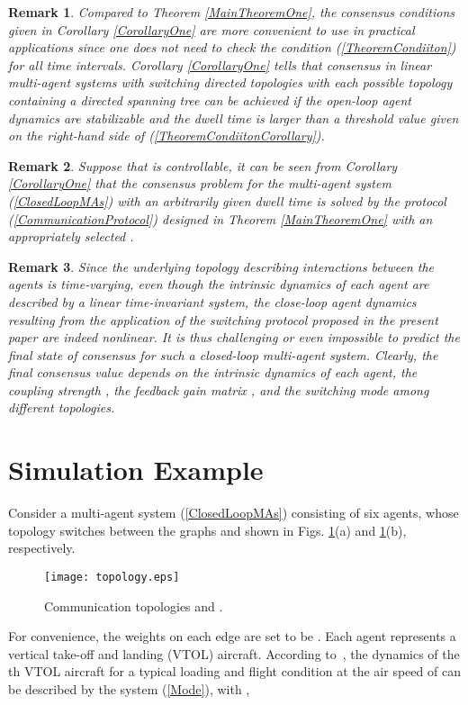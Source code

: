 \documentclass[letterpaper, 10 pt, conference]{ieeeconf}
\newtheorem{remark}{Remark}
\begin{document}
\begin{remark}
Compared to Theorem \ref{MainTheoremOne}, the consensus conditions given in
Corollary \ref{CorollaryOne} are
more convenient to use in practical applications since one does not need to
check the condition (\ref{TheoremCondiiton}) for all time intervals.
Corollary \ref{CorollaryOne} tells that consensus in linear multi-agent
systems with switching directed topologies with each possible topology
containing a directed spanning tree can be achieved if the open-loop agent
dynamics are stabilizable and the dwell time is larger than a threshold
value given on the right-hand side of (\ref{TheoremCondiitonCorollary}).
\end{remark}

\begin{remark}\label{ControllableAnyDwelltime}
Suppose that  is controllable,  it can be seen from Corollary
\ref{CorollaryOne} that the
consensus problem
  for the multi-agent system
(\ref{ClosedLoopMAs}) with an arbitrarily given dwell time 
is solved by
  the protocol
  (\ref{CommunicationProtocol}) designed in Theorem
\ref{MainTheoremOne} with an appropriately selected .
 \end{remark}


\begin{remark}\label{RemarkOnFinalConsensusValue}
Since the underlying topology describing
  interactions between the agents is time-varying,
even though the intrinsic dynamics of each
agent are described by a linear time-invariant system, the close-loop agent
dynamics resulting from the application of
  the switching protocol proposed
in the present paper are indeed nonlinear. It is thus challenging or even
impossible to predict the final
state of consensus for such
a closed-loop multi-agent system. Clearly, the final consensus value depends on the intrinsic dynamics of each agent, the coupling strength , the feedback gain matrix , and the switching mode among different topologies.
\end{remark}




\section{Simulation Example}
Consider a multi-agent system (\ref{ClosedLoopMAs}) consisting of six
agents, whose topology switches
between the graphs
 and  shown
in Figs. \ref{FigureOne}(a) and \ref{FigureOne}(b), respectively.
\begin{figure}[!t]
\centering
\texttt{[image: topology.eps]}
 \caption{Communication topologies  and . }
\label{FigureOne}
\end{figure}
For convenience,  the weights on each edge are set to be .
Each agent represents a vertical take-off and landing (VTOL) aircraft.
According to~\cite{FeiJi},
the dynamics of the th VTOL aircraft for a typical loading and flight
condition at the air speed of  can be described by the system
(\ref{Mode}), with
,
\end{document}
